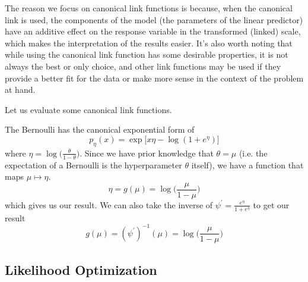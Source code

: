 \documentclass{article}
\begin{document}
      The reason we focus on canonical link functions is because, when the canonical link is used, the components of the model (the parameters of the linear predictor) have an additive effect on the response variable in the transformed (linked) scale, which makes the interpretation of the results easier. It's also worth noting that while using the canonical link function has some desirable properties, it is not always the best or only choice, and other link functions may be used if they provide a better fit for the data or make more sense in the context of the problem at hand.

      Let us evaluate some canonical link functions. 

      \begin{example}
      The Bernoulli has the canonical exponential form of 
      \[p_\eta (x) = \exp \big[ x \eta - \log (1 + e^\eta) \big]\]
      where $\eta = \log \big( \frac{\theta}{1 - \theta} \big)$. Since we have prior knowledge that $\theta = \mu$ (i.e. the expectation of a Bernoulli is the hyperparameter $\theta$ itself), we have a function that maps $\mu \mapsto \eta$. 
      \[\eta = g(\mu) = \log \bigg( \frac{\mu}{1 - \mu} \bigg)\]
      which gives us our result. We can also take the inverse of $\psi^\prime = \frac{e^\eta}{1 + e^\eta}$ to get our result 
      \[g (\mu) = (\psi^\prime)^{-1} (\mu) = \log \bigg( \frac{\mu}{1 - \mu} \bigg) \]
      \end{example}

  \subsection{Likelihood Optimization}
\end{document}
